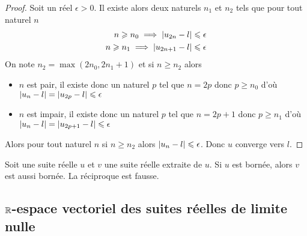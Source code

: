 \begin{proof}
  Soit un réel $\epsilon>0$. Il existe alors deux naturels $n_1$ et $n_2$ tels que pour tout naturel $n$
  \begin{align}
    n \geqslant n_0 \implies \left\lvert u_{2n}-l\right\rvert \leqslant \epsilon \\  n \geqslant n_1 \implies \left\lvert u_{2n+1}-l\right\rvert \leqslant \epsilon
  \end{align}
  On note $n_2=\max(2n_0,2n_1+1)$ et si $n \geqslant n_2$ alors
  \begin{itemize}
  \item $n$ est pair, il existe donc un naturel $p$ tel que $n=2p$ donc $p\geqslant n_0$ d'où $\left\lvert u_n-l\right\rvert=\left\lvert u_{2p}-l\right\rvert \leqslant \epsilon$
  \item $n$ est impair, il existe donc un naturel $p$ tel que $n=2p+1$ donc $p\geqslant n_1$ d'où $\left\lvert u_n-l\right\rvert=\left\lvert u_{2p+1}-l\right\rvert \leqslant \epsilon$
  \end{itemize}
  Alors pour tout naturel $n$ si $n \geqslant n_2$ alors $\left\lvert u_n-l\right\rvert \leqslant \epsilon$. Donc $u$ converge vers $l$.
\end{proof}
\begin{prop}
  Soit une suite réelle $u$ et $v$ une suite réelle extraite de $u$. Si $u$ est bornée, alors $v$ est aussi bornée. La réciproque est fausse.
\end{prop}

\subsection{$\mathbb{R}$-espace vectoriel des suites réelles de limite nulle}

